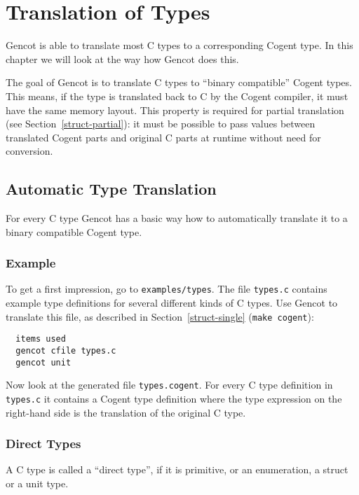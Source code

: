 \documentclass[a4paper]{report}
\newcommand{\code}[1]{\textnormal{\texttt{#1}}}
\begin{document}
\chapter{Translation of Types}
\label{types}

Gencot is able to translate most C types to a corresponding Cogent type. In this chapter we will look at the way 
how Gencot does this.

The goal of Gencot is to translate C types to ``binary compatible'' Cogent types. This means, if the type is 
translated back to C by the Cogent compiler, it must have the same memory layout. This property is required
for partial translation (see Section~\ref{struct-partial}): it must be possible to pass values between 
translated Cogent parts and original C parts at runtime without need for conversion.

\section{Automatic Type Translation}
\label{types-auto}

For every C type Gencot has a basic way how to automatically translate it to a binary compatible Cogent type. 

\subsection{Example}
\label{types-auto-example}

To get a first impression, go to \code{examples/types}. The file \code{types.c} contains example type definitions
for several different kinds of C types. Use Gencot to translate this file, as described in Section~\ref{struct-single} 
(\code{make cogent}):
\begin{verbatim}
  items used
  gencot cfile types.c
  gencot unit
\end{verbatim}

Now look at the generated file \code{types.cogent}. For every C type definition in \code{types.c} it contains 
a Cogent type definition where the type expression on the right-hand side is the translation of the original C type.

\subsection{Direct Types}
\label{types-auto-direct}

A C type is called a ``direct type'', if it is primitive, or an enumeration, a struct or a unit type.
\end{document}
